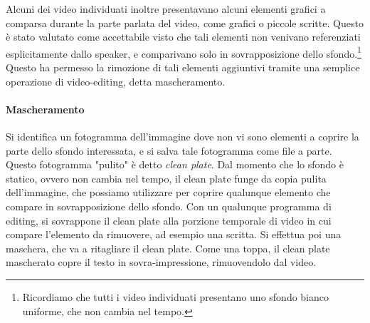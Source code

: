 Alcuni dei video individuati inoltre presentavano alcuni elementi grafici a comparsa durante la parte parlata del video, come grafici o piccole scritte. Questo è stato valutato come accettabile visto che tali elementi non venivano referenziati esplicitamente dallo speaker, e comparivano solo in sovrapposizione dello sfondo.\footnote{Ricordiamo che tutti i video individuati presentano uno sfondo bianco uniforme, che non cambia nel tempo.} Questo ha permesso la rimozione di tali elementi aggiuntivi tramite una semplice operazione di video-editing, detta mascheramento.

\paragraph{Mascheramento}

Si identifica un fotogramma dell'immagine dove non vi sono elementi a coprire la parte dello sfondo interessata, e si salva tale fotogramma come file a parte. Questo fotogramma "pulito" è detto \textit{clean plate}. Dal momento che lo sfondo è statico, ovvero non cambia nel tempo, il clean plate funge da copia pulita dell'immagine, che possiamo utilizzare per coprire qualunque elemento che compare in sovrapposizione dello sfondo. Con un qualunque programma di editing, si sovrappone il clean plate alla porzione temporale di video in cui compare l'elemento da rimuovere, ad esempio una scritta. Si effettua poi una maschera, che va a ritagliare il clean plate. Come una toppa, il clean plate mascherato copre il testo in sovra-impressione, rimuovendolo dal video.

